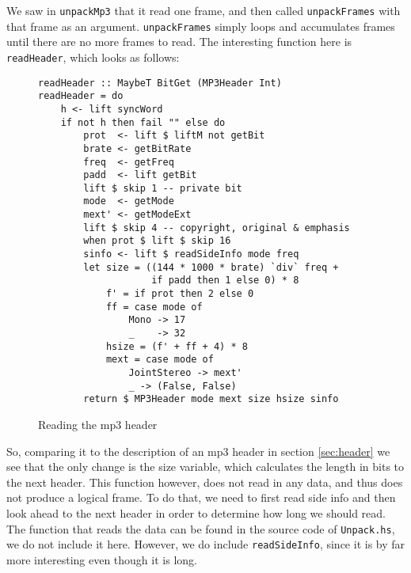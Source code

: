 \documentclass[a4paper,12pt]{article}
\begin{document}
    We saw in \texttt{unpackMp3} that it read one frame, and then called
    \texttt{unpackFrames} with that frame as an argument. \texttt{unpackFrames}
    simply loops and accumulates frames until there are no more frames to read.
    The interesting function here is \texttt{readHeader}, which looks as
    follows:
\begin{figure}[H]
  \begin{center}
    \begin{lstlisting}
readHeader :: MaybeT BitGet (MP3Header Int)
readHeader = do
    h <- lift syncWord
    if not h then fail "" else do
        prot  <- lift $ liftM not getBit
        brate <- getBitRate
        freq  <- getFreq
        padd  <- lift getBit
        lift $ skip 1 -- private bit
        mode  <- getMode
        mext' <- getModeExt
        lift $ skip 4 -- copyright, original & emphasis
        when prot $ lift $ skip 16
        sinfo <- lift $ readSideInfo mode freq
        let size = ((144 * 1000 * brate) `div` freq +
                    if padd then 1 else 0) * 8
            f' = if prot then 2 else 0
            ff = case mode of
                Mono -> 17
                _    -> 32
            hsize = (f' + ff + 4) * 8
            mext = case mode of
                JointStereo -> mext'
                _ -> (False, False)
        return $ MP3Header mode mext size hsize sinfo
    \end{lstlisting}
    \caption{Reading the mp3 header}\label{fig:read_mp3_header}
  \end{center}
\end{figure}

    So, comparing it to the description of an mp3 header in section
    \ref{sec:header} we see that the only change is the size variable, which
    calculates the length in bits to the next header. This function however,
    does not read in any data, and thus does not produce a logical frame. To do
    that, we need to first read side info and then look ahead to the next
    header in order to determine how long we should read. The function that
    reads the data can be found in the source code of \texttt{Unpack.hs}, we do
    not include it here. However, we do include \texttt{readSideInfo}, since it
    is by far more interesting even though it is long.
\end{document}
